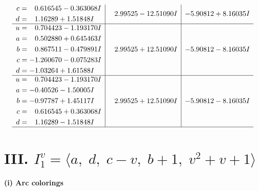 \documentclass[1p]{elsarticle_modified}
\theoremstyle{definition}
\begin{document}
$$\begin{array}{c|c|c}
\begin{aligned}
c &= \phantom{-}0.616545 - 0.363068 I \\
d &= \phantom{-}1.16289 + 1.51848 I\end{aligned}
 & \phantom{-}2.99525 - 12.51090 I & -5.90812 + 8.16035 I \\ \hline\begin{aligned}
u &= \phantom{-}0.704423 - 1.193170 I \\
a &= \phantom{-}0.502880 + 0.645463 I \\
b &= \phantom{-}0.867511 - 0.479891 I \\
c &= -1.260670 - 0.075283 I \\
d &= -1.03264 + 1.61588 I\end{aligned}
 & \phantom{-}2.99525 + 12.51090 I & -5.90812 - 8.16035 I \\ \hline\begin{aligned}
u &= \phantom{-}0.704423 - 1.193170 I \\
a &= -0.40526 - 1.50005 I \\
b &= -0.97787 + 1.45117 I \\
c &= \phantom{-}0.616545 + 0.363068 I \\
d &= \phantom{-}1.16289 - 1.51848 I\end{aligned}
 & \phantom{-}2.99525 + 12.51090 I & -5.90812 - 8.16035 I\\
 \hline 
 \end{array}$$\newpage\newpage\renewcommand{\arraystretch}{1}
\centering \section*{III. $I^v_{1}= \langle a,\;d,\;c- v,\;b+1,\;v^2+v+1 \rangle$}
\flushleft \textbf{(i) Arc colorings}\\
\end{document}
